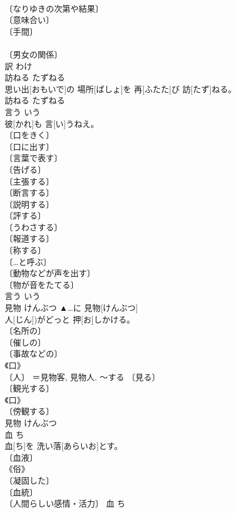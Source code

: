 \documentclass[8pt]{extreport}
\begin{document}
\begin{CJK}{UTF8}{min}
\\	〔なりゆきの次第や結果〕 
\\	〔意味合い〕 
\\	〔手間〕 
\\	[⇒わけない] 
\\	〔男女の関係〕 
\\	[⇒わけあり]	訳	わけ	
\\	訪ねる	たずねる	
\\	思い出[おもいで]の 場所[ばしょ]を 再[ふたた]び 訪[たず]ねる。	
\\	訪ねる	たずねる	
\\	言う	いう	
\\	彼[かれ]も 言[い]うねえ。	
\\	〔口をきく〕 
\\	〔口に出す〕 
\\	〔言葉で表す〕 
\\	〔告げる〕 
\\	〔主張する〕 
\\	〔断言する〕 
\\	〔説明する〕 
\\	〔評する〕 
\\	〔うわさする〕 
\\	〔報道する〕 
\\	〔称する〕 
\\	〔…と呼ぶ〕 
\\	〔動物などが声を出す〕 
\\	〔物が音をたてる〕 
\\	言う	いう	
\\	見物	けんぶつ	▲…に 見物[けんぶつ]
\\	人[じん])がどっと 押[お]しかける。	
\\	〔名所の〕 
\\	〔催しの〕 
\\	〔事故などの〕 
\\	《口》 
\\	〔人〕 ＝見物客, 見物人. ～する 〔見る〕 
\\	〔観光する〕 
\\	《口》 
\\	〔傍観する〕 
\\	見物	けんぶつ	
\\	血	ち	
\\	血[ち]を 洗い落[あらいお]とす。	
\\	〔血液〕 
\\	《俗》 
\\	〔凝固した〕 
\\	〔血統〕 
\\	〔人間らしい感情・活力〕	血	ち	

\end{CJK}
\end{document}
